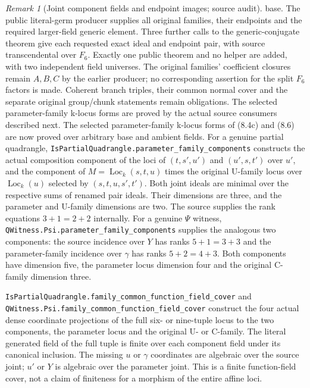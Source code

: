 \documentclass[11pt,oneside]{article}
\theoremstyle{definition}
\theoremstyle{remark}
\newtheorem{remark}[theorem]{Remark}
\newcommand{\Loc}{\operatorname{Loc}}
\newcommand{\lean}[1]{\nolinkurl{#1}}
\begin{document}
\begin{remark}[Joint component fields and endpoint images; source audit]
base. The public literal-germ producer supplies all original families,
their endpoints and the required larger-field generic element. Three
further calls to the generic-conjugate theorem give each requested exact
ideal and endpoint pair, with source transcendental over $F_6$.
Exactly one public theorem and no helper are added, with two independent
field universes. The original families' coefficient closures remain
$A,B,C$ by the earlier producer; no corresponding assertion for the split
$F_6$ factors is made. Coherent branch triples, their common normal cover and the separate
original group/chunk statements remain obligations. The selected parameter-family
k-locus forms are proved by the actual source consumers described next.
The selected parameter-family k-locus forms of (8.4c) and (8.6) are now
proved over arbitrary base and ambient fields. For a genuine partial quadrangle,
\lean{IsPartialQuadrangle.parameter_family_components} constructs the actual
composition component of the loci of $(t,s',u')$ and $(u',s,t')$ over $u'$,
and the component of $M=\Loc_k(s,t,u)$ times the original U-family locus
over $\Loc_k(u)$ selected by $(s,t,u,s',t')$. Both joint ideals are minimal
over the respective sums of renamed pair ideals. Their dimensions are three,
and the parameter and U-family dimensions are two. The source supplies the
rank equations $3+1=2+2$ internally. For a genuine $\Psi$ witness,
\lean{QWitness.Psi.parameter_family_components} supplies the analogous two
components: the source incidence over $Y$ has ranks $5+1=3+3$ and the
parameter-family incidence over $\gamma$ has ranks $5+2=4+3$.
Both components have dimension five, the parameter locus dimension four and
the original C-family dimension three.

\lean{IsPartialQuadrangle.family_common_function_field_cover} and
\lean{QWitness.Psi.family_common_function_field_cover} construct the four
actual dense coordinate projections of the full six- or nine-tuple locus
to the two components, the parameter locus and the original U- or C-family.
The literal generated field of the full tuple is finite over each component
field under its canonical inclusion. The missing $u$ or $\gamma$ coordinates
are algebraic over the source joint; $u'$ or $Y$ is algebraic over the
parameter joint. This is a finite function-field cover, not a claim of
finiteness for a morphism of the entire affine loci.


\end{remark}
\end{document}

